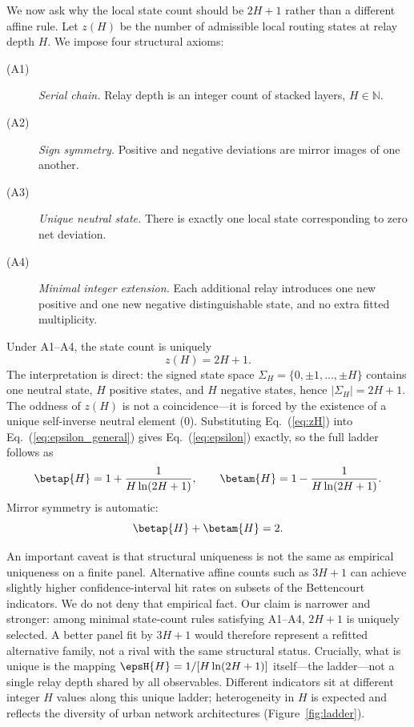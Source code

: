 We now ask why the local state count should be \(2H+1\) rather than a different
affine rule.
Let \(z(H)\) be the number of admissible local routing states at relay depth
\(H\).
We impose four structural axioms:
\begin{description}
\item[(A1)] \emph{Serial chain.} Relay depth is an integer count of stacked
layers, \(H\in\mathbb{N}\).
\item[(A2)] \emph{Sign symmetry.} Positive and negative deviations are mirror
images of one another.
\item[(A3)] \emph{Unique neutral state.} There is exactly one local state
corresponding to zero net deviation.
\item[(A4)] \emph{Minimal integer extension.} Each additional relay introduces
one new positive and one new negative distinguishable state, and no extra
fitted multiplicity.
\end{description}
Under A1--A4, the state count is uniquely
\begin{equation}
z(H)=2H+1.
\label{eq:zH}
\end{equation}
The interpretation is direct: the signed state space
$\Sigma_H=\{0,\pm 1,\ldots,\pm H\}$ contains one neutral state, $H$
positive states, and $H$ negative states, hence
$|\Sigma_H|=2H+1$.
The oddness of $z(H)$ is not a coincidence---it is forced by the
existence of a unique self-inverse neutral element ($0$).
Substituting Eq.~(\ref{eq:zH}) into Eq.~(\ref{eq:epsilon_general}) gives
Eq.~(\ref{eq:epsilon}) exactly, so the full ladder follows as
\begin{equation}
\betap{H}=1+\frac{1}{H\ln(2H+1)},\qquad
\betam{H}=1-\frac{1}{H\ln(2H+1)}.
\label{eq:ladder_explicit}
\end{equation}
Mirror symmetry is automatic:
\begin{equation}
\betap{H}+\betam{H}=2.
\label{eq:mirror}
\end{equation}

An important caveat is that structural uniqueness is not the same as empirical uniqueness on a finite
panel.
Alternative affine counts such as \(3H+1\) can achieve slightly higher
confidence-interval hit rates on subsets of the Bettencourt indicators.
We do not deny that empirical fact.
Our claim is narrower and stronger: among minimal state-count rules satisfying
A1--A4, \(2H+1\) is uniquely selected.
A better panel fit by \(3H+1\) would therefore represent a refitted
alternative family, not a rival with the same structural status.
Crucially, what is unique is the mapping
\(\epsH{H}=1/[H\ln(2H+1)]\) itself---the ladder---not a single relay depth
shared by all observables.
Different indicators sit at different integer \(H\) values along this unique
ladder; heterogeneity in \(H\) is expected and reflects the diversity of
urban network architectures (Figure~\ref{fig:ladder}).

